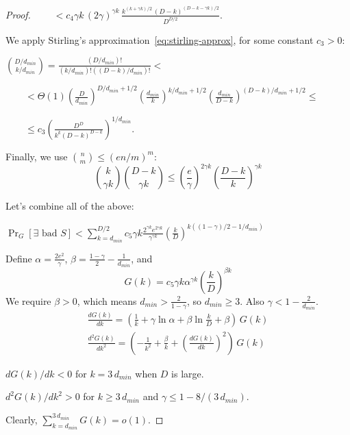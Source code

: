 \begin{proof}
    $\qquad<c_4\gamma k\,(2\gamma)^{\gamma k}\,\frac{
        k^{(k+\gamma k)/2}\,
        (D-k)^{(D-k-\gamma k)/2}
    }{D^{D/2}}$.

    We apply Stirling's approximation~\eqref{eq:stirling-approx},
    for some constant $c_3>0$:

    $\binom{D/d_{min}}{k/d_{min}}=\frac{(D/d_{min})!}{(k/d_{min})!((D-k)/d_{min})!}<$
    
    $\qquad<\Theta(1)
    \left(\frac{D}{d_{min}}\right)^{D/d_{min}+1/2}
    \left(\frac{d_{min}}{k}\right)^{k/d_{min}+1/2}
    \left(\frac{d_{min}}{D-k}\right)^{(D-k)/d_{min}+1/2}\leq$
    
    $\qquad\leq c_3\left(\frac{D^D}{k^k(D-k)^{D-k}}\right)^{1/d_{min}}$.
    
    Finally, we use $\binom{n}{m}\leq(en/m)^m$:
    \begin{equation*}
        \binom{k}{\gamma k}\binom{D-k}{\gamma k}
        \leq\left(\frac{e}{\gamma}\right)^{2\gamma k}\left(\frac{D-k}{k}\right)^{\gamma k}
    \end{equation*}
    
    Let's combine all of the above:
    
    $\Pr_G[\exists\text{ bad }S]<\sum_{k=d_{min}}^{D/2}{c_5\gamma k
    \frac{2^{\gamma k}e^{2\gamma k}}{\gamma^{\gamma k}}
    \left(\frac{k}{D}\right)^{k((1-\gamma)/2-1/d_{min})}}$
    
    Define $\alpha=\frac{2e^2}{\gamma}$,
    $\beta=\frac{1-\gamma}{2}-\frac{1}{d_{min}}$, and
    \begin{equation}
        G(k)=c_5\gamma k\alpha^{\gamma k}\left(\frac{k}{D}\right)^{\beta k}
    \end{equation}
    We require $\beta>0$, which means $d_{min}>\frac{2}{1-\gamma}$,
    so $d_{min}\geq3$. Also $\gamma<1-\frac{2}{d_{min}}$.
    \begin{gather}
        \frac{dG(k)}{dk}=\left(\frac{1}{k}+\gamma\ln\alpha+\beta\ln\frac{k}{D}+\beta\right)\,G(k)\\
        \frac{d^2G(k)}{dk^2}=\left(-\frac{1}{k^2}+\frac{\beta}{k}+\left(\frac{dG(k)}{dk}\right)^2\right)\,G(k)
    \end{gather}
    
    $dG(k)/dk<0$ for $k=3\,d_{min}$ when $D$ is large.
    
    $d^2G(k)/dk^2>0$ for $k\geq3\,d_{min}$ and $\gamma\leq1-8/(3\,d_{min})$. %
    
    Clearly, $\sum_{k=d_{min}}^{3\,d_{min}}{G(k)}=o(1)$.
    

\end{proof}
